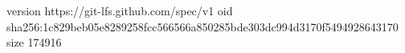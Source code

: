 version https://git-lfs.github.com/spec/v1
oid sha256:1c829beb05e8289258fcc566566a850285bde303dc994d3170f5494928643170
size 174916
